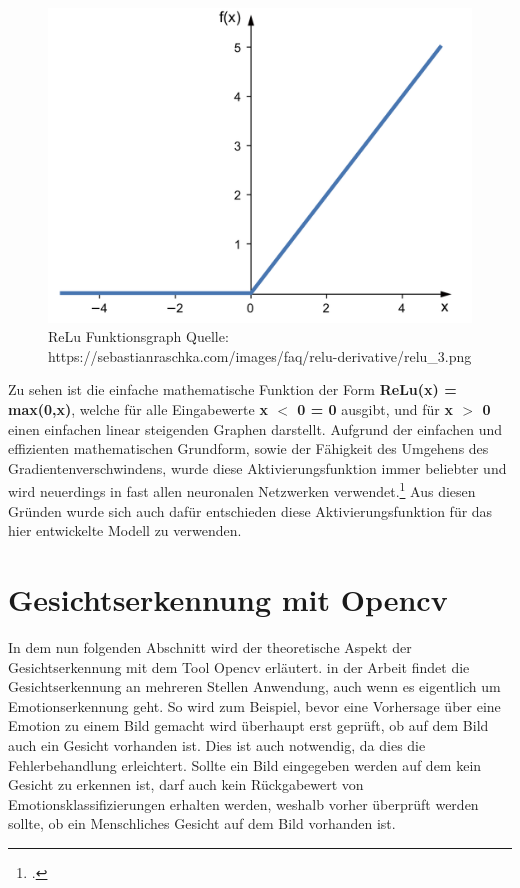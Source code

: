 \documentclass[12pt, a4paper]{scrbook}
\begin{document}
\begin{figure}[H]
\includegraphics[width=\linewidth]{Bilder/relu.png}
\caption{ReLu Funktionsgraph \newline Quelle: https://sebastianraschka.com/images/faq/relu-derivative/relu\_3.png}
\label{fig: ReLu}
\end{figure}
Zu sehen ist die einfache mathematische Funktion der Form \textbf{ReLu(x) = max(0,x)}, welche für alle Eingabewerte \textbf{x $<$ 0 = 0} ausgibt, und für \textbf{x $>$ 0} einen einfachen linear steigenden Graphen darstellt. Aufgrund der einfachen und effizienten mathematischen Grundform, sowie der Fähigkeit des Umgehens des Gradientenverschwindens, wurde diese Aktivierungsfunktion immer beliebter und wird neuerdings in fast allen neuronalen Netzwerken verwendet.\footcite[Vgl.][]{Aktivierungsfunktion2}
\newline
Aus diesen Gründen wurde sich auch dafür entschieden diese Aktivierungsfunktion für das hier entwickelte Modell zu verwenden.

\section{Gesichtserkennung mit Opencv}
In dem nun folgenden Abschnitt wird der theoretische Aspekt der Gesichtserkennung mit dem Tool Opencv erläutert. in der Arbeit findet die Gesichtserkennung an mehreren Stellen Anwendung, auch wenn es eigentlich um Emotionserkennung geht. So wird zum Beispiel, bevor eine Vorhersage über eine Emotion zu einem Bild gemacht wird überhaupt erst geprüft, ob auf dem Bild auch ein Gesicht vorhanden ist. Dies ist auch notwendig, da dies die Fehlerbehandlung erleichtert. Sollte ein Bild eingegeben werden auf dem kein Gesicht zu erkennen ist, darf auch kein Rückgabewert von Emotionsklassifizierungen erhalten werden, weshalb vorher überprüft werden sollte, ob ein Menschliches Gesicht auf dem Bild vorhanden ist.
\end{document}
